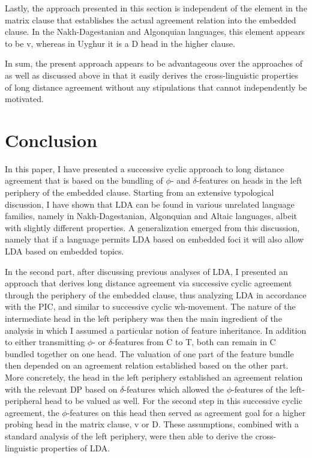 \documentclass[output=paper
,modfonts
,nonflat]{langsci/langscibook}
\begin{document}
Lastly, the approach presented in this section is independent of the element in the matrix clause that establishes the actual agreement relation into the embedded clause. In the Nakh-Dagestanian and Algonquian languages, this element appears to be v, whereas in Uyghur it is a D head in the higher clause.

In sum, the present approach appears to be advantageous over the approaches of \citet{Polinsky_Potsdam2001} as well as \citet{Bjorkman_Zeijlstra2014} discussed above in that it easily derives the cross-linguistic properties of long distance agreement without any stipulations that cannot independently be motivated.

\section{Conclusion}
\label{ch:5}

In this paper, I have presented a successive cyclic approach to long distance agreement that is based on the bundling of $ \phi $- and $ \delta $-features on heads in the left periphery of the embedded clause. Starting from an extensive typological discussion, I have shown that LDA can be found in various unrelated language families, namely in Nakh-Dagestanian, Algonquian and Altaic languages, albeit with slightly different properties. A generalization emerged from this discussion, namely that if a language permits LDA based on embedded foci it will also allow LDA based on embedded topics.

In the second part, after discussing previous analyses of LDA, I presented an approach that derives long distance agreement via successive cyclic agreement through the periphery of the embedded clause, thus analyzing LDA in accordance with the PIC, and similar to successive cyclic wh-movement. The nature of the intermediate head in the left periphery was then the main ingredient of the analysis in which I assumed a particular notion of feature inheritance. In addition to either transmitting $ \phi $- or $ \delta $-features from C to T, both can remain in C bundled together on one head. The valuation of one part of the feature bundle then depended on an agreement relation established based on the other part. More concretely, the head in the left periphery established an agreement relation with the relevant DP based on $ \delta $-features which allowed the $ \phi $-features of the left-peripheral head to be valued as well. For the second step in this successive cyclic agreement, the $ \phi $-features on this head then served as agreement goal for a higher probing head in the matrix clause, v or D. These assumptions, combined with a standard analysis of the left periphery, were then able to derive the cross-linguistic properties of LDA.
\end{document}
